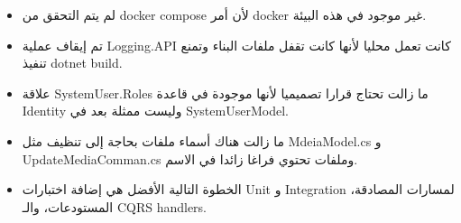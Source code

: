 \documentclass[12pt,a4paper]{article}
\begin{document}
\begin{itemize}
  \item لم يتم التحقق من \textenglish{docker compose} لأن أمر \textenglish{docker} غير موجود في هذه البيئة.
  \item تم إيقاف عملية \textenglish{Logging.API} كانت تعمل محليا لأنها كانت تقفل ملفات البناء وتمنع تنفيذ \textenglish{dotnet build}.
  \item علاقة \textenglish{SystemUser.Roles} ما زالت تحتاج قرارا تصميميا لأنها موجودة في قاعدة Identity وليست ممثلة بعد في \textenglish{SystemUserModel}.
  \item ما زالت هناك أسماء ملفات بحاجة إلى تنظيف مثل \textenglish{MdeiaModel.cs} و \textenglish{UpdateMediaComman.cs} وملفات تحتوي فراغا زائدا في الاسم.
  \item الخطوة التالية الأفضل هي إضافة اختبارات Unit و Integration لمسارات المصادقة، المستودعات، والـ CQRS handlers.
\end{itemize}
\end{document}
